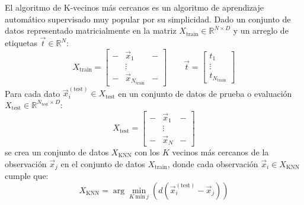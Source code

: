 \documentclass{article}
\begin{document}
El algoritmo de K-vecinos más cercanos es un algoritmo de aprendizaje automático supervisado muy popular por su simplicidad. Dado un conjunto de datos representado matricialmente en la matriz $X_{\textrm{train}}\in\mathbb{R}^{N\times D}$ y un arreglo de etiquetas $\overrightarrow{t}\in\mathbb{R}^{N}$:
\[
X_{\textrm{train}}=\begin{bmatrix}- & \overrightarrow{x}_{1} & -\\
 & \vdots\\
- & \overrightarrow{x}_{N_{\textrm{train}}} & -
\end{bmatrix}\qquad\overrightarrow{t}=\begin{bmatrix}t_{1}\\
\vdots\\
t_{N_{\textrm{train}}}
\end{bmatrix}
\]
Para cada dato $\overrightarrow{x}_{i}^{\left(\textrm{test}\right)}\in X_{\textrm{test}}$ en un conjunto de datos de prueba o evaluación $X_{\textrm{test}}\in\mathbb{R}^{N_{\textrm{test}}\times D}$:
\[
X_{\textrm{test}}=\begin{bmatrix}- & \overrightarrow{x}_{1} & -\\
 & \vdots\\
- & \overrightarrow{x}_{N} & -
\end{bmatrix}
\]
se crea un conjunto de datos $X_{\textrm{KNN}}$ con los $K$ vecinos más cercanos de la observación $\overrightarrow{x}_{j}$ en el conjunto
de datos $X_{\textrm{train}}$, donde cada observación $\overrightarrow{x}_{i}\in X_{\textrm{KNN}}$ cumple que:
\[
X_{\textrm{KNN}}=\arg\min_{K\:\textrm{min}\:j}\left(d\left(\overrightarrow{x}_{i}^{\left(\textrm{test}\right)}-\overrightarrow{x}_{j}\right)\right)
\]
\end{document}
